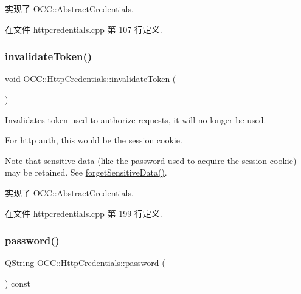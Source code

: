 实现了 \hyperlink{class_o_c_c_1_1_abstract_credentials_ae5b9fd23e37129efede9b4d430ac5766}{O\+C\+C\+::\+Abstract\+Credentials}.



在文件 httpcredentials.\+cpp 第 107 行定义.

\mbox{\label{class_o_c_c_1_1_http_credentials_a1ea63d4fa2bb42a61ce3bfde3332c754}} 
\subsubsection{\texorpdfstring{invalidate\+Token()}{invalidateToken()}}
{\footnotesize\ttfamily void O\+C\+C\+::\+Http\+Credentials\+::invalidate\+Token (\begin{DoxyParamCaption}{ }\end{DoxyParamCaption})\hspace{0.3cm}{\ttfamily [virtual]}}

Invalidates token used to authorize requests, it will no longer be used.

For http auth, this would be the session cookie.

Note that sensitive data (like the password used to acquire the session cookie) may be retained. See \hyperlink{class_o_c_c_1_1_http_credentials_a332002f8a742266ab26f7bc5eb1d4737}{forget\+Sensitive\+Data()}. 

实现了 \hyperlink{class_o_c_c_1_1_abstract_credentials_a9c5d9d0c3e4a8fc1ff8cf45efc2f0337}{O\+C\+C\+::\+Abstract\+Credentials}.



在文件 httpcredentials.\+cpp 第 199 行定义.

\mbox{\label{class_o_c_c_1_1_http_credentials_aee8a84580d869fce1b4f2be0cc053e77}} 
\subsubsection{\texorpdfstring{password()}{password()}}
{\footnotesize\ttfamily Q\+String O\+C\+C\+::\+Http\+Credentials\+::password (\begin{DoxyParamCaption}{ }\end{DoxyParamCaption}) const}



